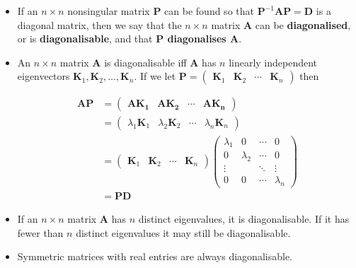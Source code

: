 \documentclass{article}
\begin{document}
\begin{itemize}
  \item If an $n \times n$ nonsingular matrix $\mathbf{P}$ can be found so that $\mathbf{P}^{-1} \mathbf{A} \mathbf{P} = \mathbf{D}$ is a diagonal matrix, then we say that the $n \times n$ matrix $\mathbf{A}$ can be \textbf{diagonalised}, or is \textbf{diagonalisable}, and that \textbf{$\mathbf{P}$ diagonalises $\mathbf{A}$}.

  \item An $n \times n$ matrix $\mathbf{A}$ is diagonalisable iff $\mathbf{A}$ has $n$ linearly independent eigenvectors $\mathbf{K}_1, \mathbf{K}_2, \ldots, \mathbf{K}_n$. If we let $\mathbf{P} = \begin{pmatrix}
            \mathbf{K}_1 & \mathbf{K}_2 & \cdots & \mathbf{K}_n
          \end{pmatrix}$ then

        \begin{align*}
          \mathbf{A P} & = \begin{pmatrix}
                             \mathbf{A K_1} & \mathbf{A K_2} & \cdots & \mathbf{A K_n}
                           \end{pmatrix}                         \\
                       & = \begin{pmatrix}
                             \lambda_1 \mathbf{K}_1 & \lambda_2 \mathbf{K}_2 & \cdots & \lambda_n \mathbf{K}_n
                           \end{pmatrix} \\
                       & = \begin{pmatrix}
                             \mathbf{K}_1 & \mathbf{K}_2 & \cdots & \mathbf{K}_n
                           \end{pmatrix} \begin{pmatrix}
                                           \lambda_1 & 0         & \cdots & 0         \\
                                           0         & \lambda_2 & \cdots & 0         \\
                                           \vdots    &           & \ddots & \vdots    \\
                                           0         & 0         & \cdots & \lambda_n
                                         \end{pmatrix}                          \\
                       & = \mathbf{P} \mathbf{D}
        \end{align*}

  \item If an $n \times n$ matrix $\mathbf{A}$ has $n$ distinct eigenvalues, it is diagonalisable. If it has fewer than $n$ distinct eigenvalues it may still be diagonalisable.

  \item Symmetric matrices with real entries are always diagonalisable.
\end{itemize}
\end{document}
